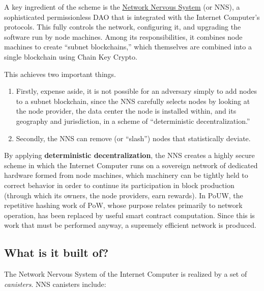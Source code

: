 A key ingredient of the scheme is the \href{https://wiki.internetcomputer.org/wiki/Network_Nervous_System}{Network Nervous System} (or NNS), a sophisticated permissionless DAO that is integrated with the Internet Computer's protocols. This fully controls the network, configuring it, and upgrading the software run by node machines. Among its responsibilities, it combines node machines to create ``subnet blockchains,'' which themselves are combined into a single blockchain using Chain Key Crypto.

This achieves two important things.

\begin{enumerate}
  \item Firstly, expense aside, it is not possible for an adversary simply to add nodes to a subnet blockchain, since the NNS carefully selects nodes by looking at the node provider, the data center the node is installed within, and its geography and jurisdiction, in a scheme of ``deterministic decentralization.''
  \item Secondly, the NNS can remove (or ``slash'') nodes that statistically deviate.
\end{enumerate}

By applying \textbf{deterministic decentralization}, the NNS creates a highly secure scheme in which the Internet Computer runs on a sovereign network of dedicated hardware formed from node machines, which machinery can be tightly held to correct behavior in order to continue its participation in block production (through which its owners, the node providers, earn rewards). In PoUW, the repetitive hashing work of PoW, whose purpose relates primarily to network operation, has been replaced by useful smart contract computation. Since this is work that must be performed anyway, a supremely efficient network is produced.

\subsection{What is it built of?}

The Network Nervous System of the Internet Computer is realized by a set of \textit{canisters}. NNS canisters include:

